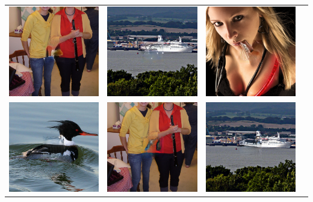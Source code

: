 \begin{longtable}{cccc}
  \includegraphics[width=.24\textwidth]{figures/imagenet/imagenet_0034_siggraph2017.png}&
  \includegraphics[width=.24\textwidth]{figures/imagenet/imagenet_0165_siggraph2017.png}&
  \includegraphics[width=.24\textwidth]{figures/imagenet/imagenet_0197_siggraph2017.png}\\
  \includegraphics[width=.24\textwidth]{figures/imagenet/imagenet_0011_g.png}&
  \includegraphics[width=.24\textwidth]{figures/imagenet/imagenet_0034_g.png}&
  \includegraphics[width=.24\textwidth]{figures/imagenet/imagenet_0165_g.png}&

\end{longtable}
